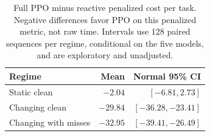 \begin{table}[t]
\caption{Full PPO minus reactive penalized cost per task. Negative differences favor PPO on this penalized metric, not raw time. Intervals use 128 paired sequences per regime, conditional on the five models, and are exploratory and unadjusted.}
\label{tab:paired}\centering\small
\begin{tabular}{lrr}\hline Regime & Mean & Normal 95\% CI \\ \hline
Static clean & $-2.04$ & $[-6.81, 2.73]$ \\
Changing clean & $-29.84$ & $[-36.28, -23.41]$ \\
Changing with misses & $-32.95$ & $[-39.41, -26.49]$ \\
\hline\end{tabular}
\end{table}
